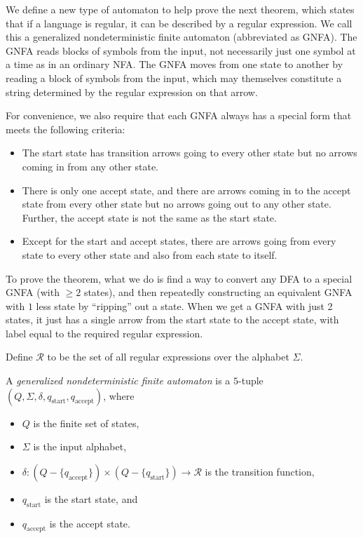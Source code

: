 We define a new type of automaton to help prove the next theorem, which states that if a language is regular, it can be described by a regular expression. We call this a generalized nondeterministic finite automaton (abbreviated as GNFA). The GNFA reads blocks of symbols from the input, not necessarily just one symbol at a time as in an ordinary NFA. The GNFA moves from one state to another by reading a block of symbols from the input, which may themselves constitute a string determined by the regular expression on that arrow.

For convenience, we also require that each GNFA always has a special form that meets the following criteria:
\begin{itemize}
    \item The start state has transition arrows going to every other state but no arrows coming in from any other state.
    \item There is only one accept state, and there are arrows coming in to the accept state from every other state but no arrows going out to any other state. Further, the accept state is not the same as the start state.
    \item Except for the start and accept states, there are arrows going from every state to every other state and also from each state to itself.
\end{itemize}

\label{regRegExpEquivSketch}
To prove the theorem, what we do is find a way to convert any DFA to a special GNFA (with $\geq 2$ states), and then repeatedly constructing an equivalent GNFA with $1$ less state by ``ripping'' out a state. When we get a GNFA with just 2 states, it just has a single arrow from the start state to the accept state, with label equal to the required regular expression.

\vspace{3mm}
Define $\mathcal{R}$ to be the set of all regular expressions over the alphabet $\Sigma$.

\begin{definition}
A \textit{generalized nondeterministic finite automaton} is a $5$-tuple $(Q,\Sigma,\delta,q_{\text{start}},q_{\text{accept}})$, where
\begin{itemize}
    \item $Q$ is the finite set of states,
    \item $\Sigma$ is the input alphabet,
    \item $\delta:(Q-\{q_{\text{accept}}\})\times(Q-\{q_{\text{start}}\})\to\mathcal{R}$ is the transition function,
    \item $q_{\text{start}}$ is the start state, and
    \item $q_{\text{accept}}$ is the accept state.
\end{itemize}
\end{definition}

